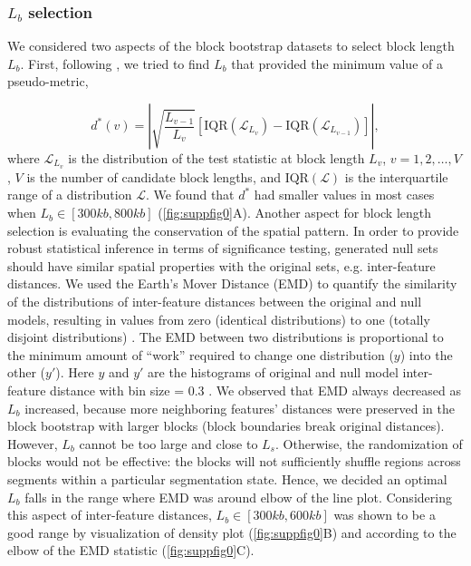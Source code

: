 \documentclass{article}
\begin{document}

\subsubsection{$L_b$ selection}\label{sec:length}


We considered two aspects of the block bootstrap datasets to select
block length $L_b$.
First, following \citet{bickel2010subsampling}, we tried to find $L_b$
that provided the minimum value of a pseudo-metric,

$$ d^*(v)= \left| \sqrt{\frac{L_{v-1}}{L_v}} [\text{IQR}(\mathcal{L}_{L_v})-\text{IQR}(\mathcal{L}_{L_{v-1}})] \right|,$$
where $\mathcal{L}_{L_v}$ is the distribution of the test statistic at
block length $L_v$, $v = 1,2,\dots,V$, $V$ is the number of candidate
block lengths, and $\text{IQR}(\mathcal{L})$ is the interquartile
range of a distribution $\mathcal{L}$.
We found that $d^*$ had
smaller values in most cases when $L_b \in [300kb,800kb]$
(\cref{fig:suppfig0}A).
Another aspect for block length selection is evaluating the
conservation of the spatial pattern. In order to provide robust
statistical inference in terms of significance testing,
generated  null sets should have similar spatial properties with
the original sets, e.g. inter-feature distances.
We used the Earth's Mover
Distance (EMD) to quantify the similarity of the distributions of
inter-feature distances between the original and 
null models, resulting 
in values from zero (identical distributions) to one (totally disjoint
distributions) \citep{emd}.
The EMD between two distributions is proportional to
the minimum amount of ``work'' required to change one distribution ($y$)
into the other ($y'$). Here $y$ and $y'$ are the histograms of
original and 
null model inter-feature distance with bin size = 0.3 .
We observed that EMD always decreased as $L_b$ increased, because more
neighboring  features' distances were preserved in the
block bootstrap with larger blocks (block boundaries break original
distances).
However, $L_b$ cannot be too large and close to $L_s$.
Otherwise, the randomization of blocks would not
be effective: the blocks will not sufficiently shuffle regions across
segments within a particular segmentation state.
Hence, we decided an optimal $L_b$ falls in the range where EMD
was around elbow of the line plot. Considering this aspect of
inter-feature distances, $L_b \in [300kb,600kb]$ was
shown to be a good range by visualization of density plot
(\cref{fig:suppfig0}B) and according to the elbow of the EMD statistic
(\cref{fig:suppfig0}C).
\end{document}
